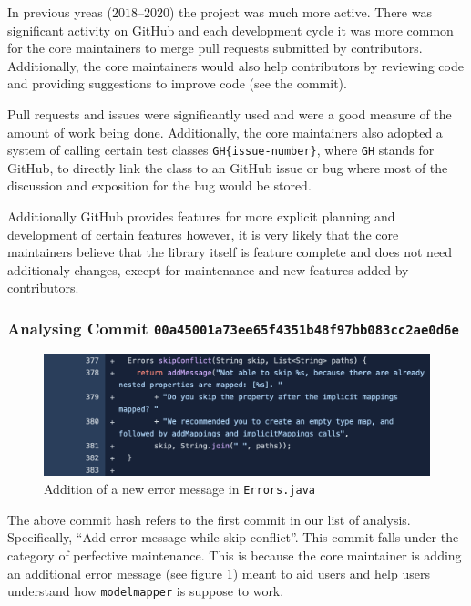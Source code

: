 \documentclass[12pt]{article}
\newcommand{\modelmapper}{\texttt{modelmapper}\xspace}
\begin{document}
In previous yreas ($2018$--$2020$) the project was much more
active. There was significant activity on GitHub and each
development cycle it was more common for the core maintainers to
merge pull requests submitted by contributors. Additionally, the
core maintainers would also help contributors by reviewing code
and providing suggestions to improve code (see the 
commit).

Pull requests and issues were significantly used and were a
good measure of the amount of work being done. Additionally, the
core maintainers also adopted a system of calling certain test
classes \verb|GH{issue-number}|, where \texttt{GH} stands for
GitHub, to directly link the class to an GitHub issue or bug
where most of the discussion and exposition for the bug would be
stored.

Additionally GitHub provides features for more explicit planning
and development of certain features however, it is very likely
that the core maintainers believe that the library itself is
feature complete and does not need additionaly changes, except
for maintenance and new features added by contributors.

\subsubsection{Analysing Commit
\texttt{00a45001a73ee65f4351b48f97bb083cc2ae0d6e}}

\begin{figure}[H]
    \centering
    \includegraphics[width=14cm]{images/code-diff.png}
    \caption{Addition of a new error message in
    \texttt{Errors.java}}
    \label{error-message}
\end{figure}

The above commit hash refers to the first commit in our list of
analysis. Specifically, ``Add error message while skip
conflict''. This commit falls under the category of perfective
maintenance. This is because the core maintainer is adding an
additional error message (see figure \ref{error-message}) meant
to aid users and help users understand how \modelmapper is
suppose to work.
\end{document}
